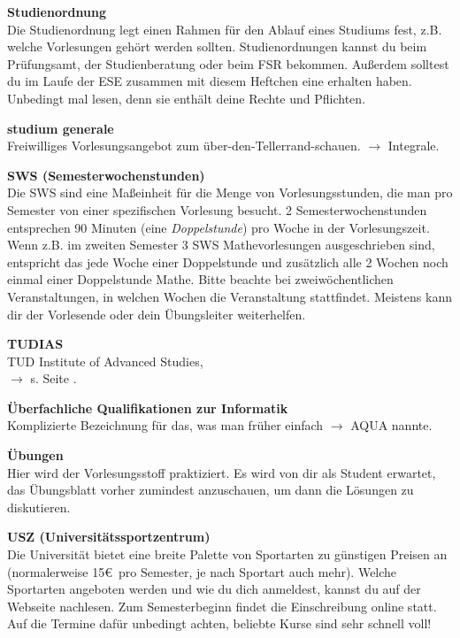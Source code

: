 \begin{multicols}{2}

\textbf{Studienordnung} \\
Die Studienordnung legt einen Rahmen für den Ablauf eines Studiums fest, z.B. welche Vorlesungen gehört werden sollten.
Studienordnungen kannst du beim Prüfungsamt, der Studienberatung oder beim FSR bekommen.
Außerdem solltest du im Laufe der ESE zusammen mit diesem Heftchen eine erhalten haben.
Unbedingt mal lesen, denn sie enthält deine Rechte und Pflichten.

\textbf{studium generale} \\
Freiwilliges Vorlesungsangebot zum über-den-Tellerrand-schauen.
$\rightarrow$ Integrale.

\textbf{SWS (Semesterwochenstunden)} \\
Die SWS sind eine Maßeinheit für die Menge von Vorlesungsstunden, die man pro Semester von einer spezifischen Vorlesung besucht.
2 Semesterwochenstunden entsprechen 90 Minuten (eine \emph{Doppelstunde}) pro Woche in der Vorlesungszeit.
Wenn z.B. im zweiten Semester 3 SWS Mathevorlesungen ausgeschrieben sind, entspricht das jede Woche einer Doppelstunde und zusätzlich alle 2 Wochen noch einmal einer Doppelstunde Mathe.
Bitte beachte bei zweiwöchentlichen Veranstaltungen, in welchen Wochen die Veranstaltung stattfindet. Meistens kann dir der Vorlesende oder dein Übungsleiter weiterhelfen.

\textbf{TUDIAS} \\
TUD Institute of Advanced Studies, \\
$\rightarrow$ s. Seite \pageref{sec:sprachausbildung}.

\textbf{Überfachliche Qualifikationen zur Informatik} \\
Komplizierte Bezeichnung für das, was man früher einfach $\rightarrow$ AQUA nannte.

\textbf{Übungen} \\
Hier wird der Vorlesungsstoff praktiziert.
Es wird von dir als Student erwartet, das Übungsblatt vorher zumindest anzuschauen, um dann die Lösungen zu diskutieren.

\textbf{USZ (Universitätssportzentrum)} \\
Die Universität bietet eine breite Palette von Sportarten zu günstigen Preisen an (normalerweise 15\euro\ pro Semester, je nach Sportart auch mehr).
Welche Sportarten angeboten werden und wie du dich anmeldest, kannst du auf der Webseite  nachlesen.
Zum Semesterbeginn findet die Einschreibung online statt.
Auf die Termine dafür unbedingt achten, beliebte Kurse sind sehr schnell voll!


\end{multicols}

